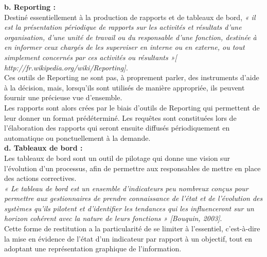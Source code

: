  \textbf{ b. Reporting :}\\
Destiné essentiellement à la production de rapports et de tableaux de bord, \textit{« il est la présentation périodique de rapports sur les activités et résultats d'une organisation, d'une unité de travail ou du responsable d'une fonction, destinée à en informer ceux chargés de les superviser en interne ou en externe, ou tout simplement concernés par ces activités ou résultants »[ http://fr.wikipedia.org/wiki/Reporting].}\\

Ces outils de Reporting ne sont pas, à proprement parler, des instruments d'aide à la décision, mais, lorsqu’ils sont utilisés de manière appropriée, ils peuvent fournir une précieuse vue d’ensemble.\\

Les rapports sont alors crées par le biais d’outils de Reporting qui permettent de leur donner un format prédéterminé. Les requêtes sont constituées lors de l’élaboration des rapports qui seront ensuite diffusés périodiquement en automatique ou ponctuellement à la demande.\\


\textbf{d. Tableaux de bord :}\\
Les tableaux de bord sont un outil de pilotage qui donne une vision sur l’évolution d’un processus, afin de permettre aux responsables de mettre en place des actions correctives.\\
\textit{« Le tableau de bord est un ensemble d’indicateurs peu nombreux conçus pour permettre aux gestionnaires de prendre connaissance de l’état et de l’évolution des systèmes qu’ils pilotent et d’identifier les tendances qui les influenceront sur un horizon cohérent avec la nature de leurs fonctions » [Bouquin, 2003]}.\\
Cette forme de restitution a la particularité de se limiter à l’essentiel, c'est-à-dire la mise en évidence de l’état d’un indicateur par rapport à un objectif, tout en adoptant une représentation graphique de l’information.\\

